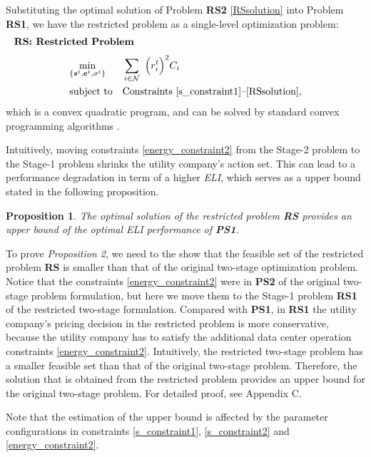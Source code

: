 \documentclass[journal]{IEEEtran}
\newtheorem{proposition}{Proposition}
\begin{document}
	Substituting the optimal solution of Problem \textbf{RS2} \eqref{RSsolution} into Problem \textbf{RS1}, we have the restricted problem as a single-level optimization problem:
	\begin{align*}
		\leftline{\textbf{RS: Restricted Problem}}
	\end{align*}
	\begin{equation*}
		\begin{aligned}
			& \underset{ \{ \boldsymbol{s}^{t}, \boldsymbol{e}^{t}, \sigma^t \}} {\min}
			& & \sum_{i \in \mathcal{N}}
			~  \Big( r_{i}^{t} \Big) ^{2} C_{i} \\
			& \text{subject to}
			& & \text{Constraints \eqref{s_constraint1}--\eqref{RSsolution}},
		\end{aligned}
	\end{equation*}
	which is a convex quadratic program, and can be solved by standard convex programming algorithms \cite{convex}.
	
	
	Intuitively, moving constraints \eqref{energy_constraint2} from the Stage-2 problem to the Stage-1 problem shrinks the utility company's action set. This can lead to a performance degradation in term of a higher \emph{ELI}, which serves as a upper bound stated in the following proposition.
	\begin{proposition}\label{upperbound}
		The optimal solution of the restricted problem \textbf{RS} provides an upper bound of the optimal \emph{ELI} performance of \textbf{PS1}.
	\end{proposition}
	
	To prove \emph{Proposition 2}, we need to the show that the feasible set of the restricted problem \textbf{RS} is smaller than that of the original two-stage optimization problem. Notice that the constraints \eqref{energy_constraint2} were in \textbf{PS2} of the original two-stage problem formulation, but here we move them to the Stage-1 problem \textbf{RS1} of the restricted two-stage formulation. Compared with \textbf{PS1}, in \textbf{RS1} the utility company's pricing decision in the restricted problem is more conservative, because the utility company has to satisfy the additional data center operation constraints \eqref{energy_constraint2}. Intuitively, the restricted two-stage problem has a smaller feasible set than that of the original two-stage problem. Therefore, the solution that is obtained from the restricted problem provides an upper bound for the original two-stage problem. For detailed proof, see Appendix C.
	
	Note that the estimation of the upper bound is affected by the parameter configurations in constraints \eqref{s_constraint1}, \eqref{s_constraint2} and \eqref{energy_constraint2}.
\end{document}
